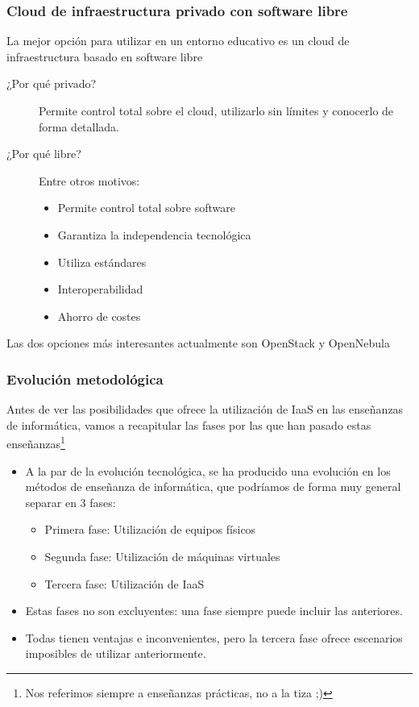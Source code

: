 \documentclass{beamer}
\begin{document}
\begin{frame}
  \frametitle{Cloud de infraestructura privado con software libre}
  La mejor opción para utilizar en un entorno educativo es un cloud de
  infraestructura basado en software libre
  \begin{description}
  \item[¿Por qué privado?] Permite control total sobre el cloud,
    utilizarlo sin límites y conocerlo de forma detallada.
  \item[¿Por qué libre?] Entre otros motivos:
    \begin{itemize}
    \item Permite control total sobre software
    \item Garantiza la independencia tecnológica
    \item Utiliza estándares
    \item Interoperabilidad
    \item Ahorro de costes
    \end{itemize}
  \end{description}
Las dos opciones más interesantes actualmente son OpenStack y OpenNebula
\end{frame}

\begin{frame}
  \frametitle{Evolución metodológica}
  Antes de ver las posibilidades que ofrece la utilización de IaaS en las
  enseñanzas de informática, vamos a recapitular las fases por las que han
  pasado estas enseñanzas\footnote{Nos referimos siempre a enseñanzas prácticas,
  no a la tiza ;)}
  \begin{itemize}
  \item A la par de la evolución tecnológica, se ha producido una evolución en
    los métodos de enseñanza de informática, que podríamos de forma muy general
    separar en 3 fases:
    \begin{itemize}
    \item Primera fase: Utilización de equipos físicos
    \item Segunda fase: Utilización de máquinas virtuales
    \item Tercera fase: Utilización de IaaS
    \end{itemize}
  \item Estas fases no son excluyentes: una fase siempre puede incluir las
    anteriores.
  \item Todas tienen ventajas e inconvenientes, pero la tercera fase ofrece
    escenarios imposibles de utilizar anteriormente.

  \end{itemize}
\end{frame}
\end{document}
